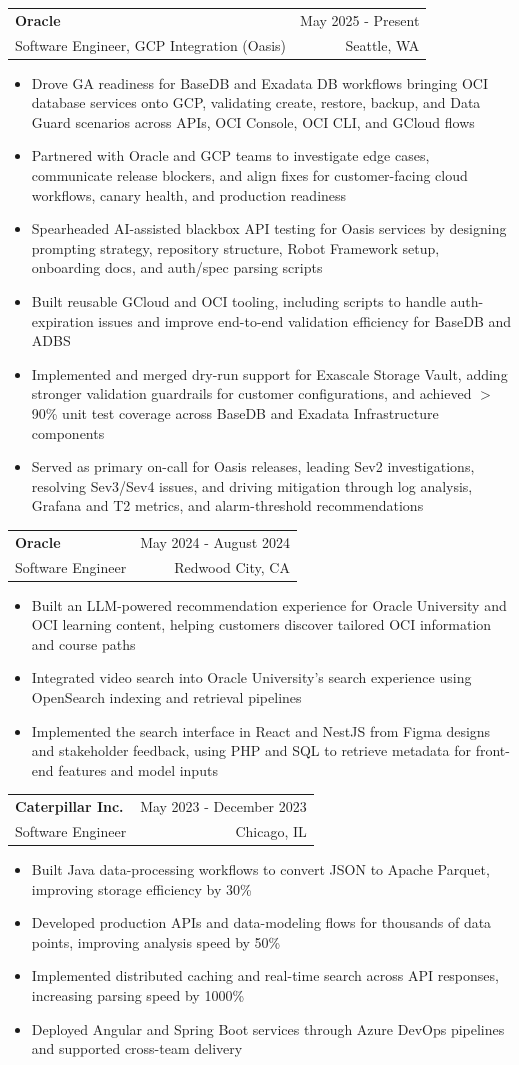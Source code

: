 \documentclass[letterpaper,11pt]{article}
\makeatletter
\newcommand{\resumeItem}[1]{
  \item\small{
    {#1 \vspace{-2pt}}
  }
}
\newcommand{\resumeSubheading}[4]{
  \vspace{-2pt}\item
    \begin{tabular*}{0.97\textwidth}[t]{l@{\extracolsep{\fill}}r}
      \textbf{#1} & #2 \\
      {\small#3} & {\small #4} \\
    \end{tabular*}\vspace{-7pt}
}
\newcommand{\resumeItemListStart}{\begin{itemize}}
\newcommand{\resumeItemListEnd}{\end{itemize}\vspace{-5pt}}
\makeatother
\begin{document}
    \resumeSubheading
  {Oracle}{May 2025 - Present}
  {Software Engineer, GCP Integration (Oasis)}{Seattle, WA}
  \resumeItemListStart
    \resumeItem{Drove GA readiness for BaseDB and Exadata DB workflows bringing OCI database services onto GCP, validating create, restore, backup, and Data Guard scenarios across APIs, OCI Console, OCI CLI, and GCloud flows}
    \resumeItem{Partnered with Oracle and GCP teams to investigate edge cases, communicate release blockers, and align fixes for customer-facing cloud workflows, canary health, and production readiness}
    \resumeItem{Spearheaded AI-assisted blackbox API testing for Oasis services by designing prompting strategy, repository structure, Robot Framework setup, onboarding docs, and auth/spec parsing scripts}
    \resumeItem{Built reusable GCloud and OCI tooling, including scripts to handle auth-expiration issues and improve end-to-end validation efficiency for BaseDB and ADBS}
    \resumeItem{Implemented and merged dry-run support for Exascale Storage Vault, adding stronger validation guardrails for customer configurations, and achieved $>$90\% unit test coverage across BaseDB and Exadata Infrastructure components}
    \resumeItem{Served as primary on-call for Oasis releases, leading Sev2 investigations, resolving Sev3/Sev4 issues, and driving mitigation through log analysis, Grafana and T2 metrics, and alarm-threshold recommendations}
  \resumeItemListEnd

    \resumeSubheading
      {Oracle}{May 2024 - August 2024}
      {Software Engineer}{Redwood City, CA}
      \resumeItemListStart
        \resumeItem{Built an LLM-powered recommendation experience for Oracle University and OCI learning content, helping customers discover tailored OCI information and course paths}
        \resumeItem{Integrated video search into Oracle University's search experience using OpenSearch indexing and retrieval pipelines}
        \resumeItem{Implemented the search interface in React and NestJS from Figma designs and stakeholder feedback, using PHP and SQL to retrieve metadata for front-end features and model inputs}
      \resumeItemListEnd

    \resumeSubheading
      {Caterpillar Inc.}{May 2023 - December 2023}
      {Software Engineer}{Chicago, IL}
      \resumeItemListStart
        \resumeItem{Built Java data-processing workflows to convert JSON to Apache Parquet, improving storage efficiency by 30\%}
        \resumeItem{Developed production APIs and data-modeling flows for thousands of data points, improving analysis speed by 50\%}
        \resumeItem{Implemented distributed caching and real-time search across API responses, increasing parsing speed by 1000\%}
        \resumeItem{Deployed Angular and Spring Boot services through Azure DevOps pipelines and supported cross-team delivery}
      \resumeItemListEnd
\end{document}
